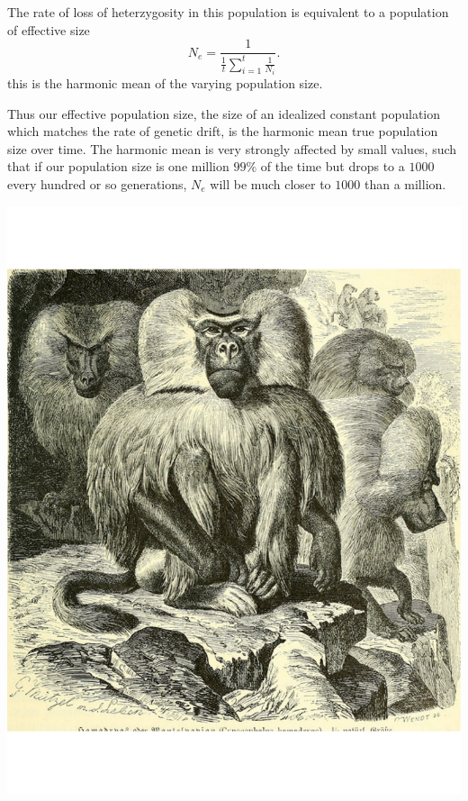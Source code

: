 The rate of loss of heterzygosity in this population is equivalent to
a population of effective size
\begin{equation}
N_e =\frac{1}{\frac{1}{t} \sum_{i=1}^{t} \frac{1}{N_i} }. \label{eq:Ne_harmonic}
\end{equation}
this is the harmonic mean of the varying population size.


Thus our
effective population size, the size of an idealized constant
population which matches the rate of genetic drift, is the harmonic
mean true population size over time. The harmonic mean is very
strongly affected by small values, such that if our population size is
one million $99\%$ of the time but drops to a $1000$ every hundred or
so generations, $N_e$ will be much closer to $1000$ than a
million. \\




\begin{marginfigure}
\begin{center}
\includegraphics[width= 0.7 \textwidth]{illustration_images/Genetic_drift/Hamadryas_baboon/Hamadryas_baboon.pdf}
\end{center}
\caption{Male Hamadryas baboons. Brehm's Tierleben. Brehm,
  A.E. 1893. Up to ten females live in a harem with a single male.  %
} \label{fig:Hamadryas_baboon}  
\end{marginfigure} 

